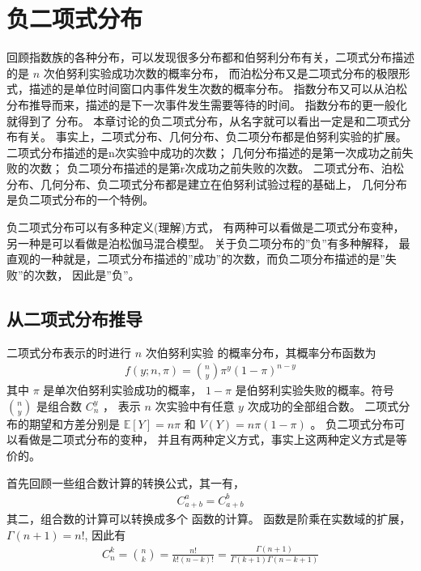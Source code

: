 \documentclass[letterpaper,10pt,english]{sphinxmanual}
\begin{document}
\section{负二项式分布}
\label{\detokenize{_u8d1f_u4e8c_u9879_u6a21_u578b/content:id2}}
回顾指数族的各种分布，可以发现很多分布都和伯努利分布有关，二项式分布描述的是 \(n\) 次伯努利实验成功次数的概率分布，
而泊松分布又是二项式分布的极限形式，描述的是单位时间窗口内事件发生次数的概率分布。
指数分布又可以从泊松分布推导而来，描述的是下一次事件发生需要等待的时间。
指数分布的更一般化就得到了  分布。
本章讨论的负二项式分布，从名字就可以看出一定是和二项式分布有关。
事实上，二项式分布、几何分布、负二项分布都是伯努利实验的扩展。
二项式分布描述的是n次实验中成功的次数；
几何分布描述的是第一次成功之前失败的次数；
负二项分布描述的是第r次成功之前失败的次数。
二项式分布、泊松分布、几何分布、负二项式分布都是建立在伯努利试验过程的基础上，
几何分布是负二项式分布的一个特例。

负二项式分布可以有多种定义(理解)方式，
有两种可以看做是二项式分布变种，另一种是可以看做是泊松\sphinxhyphen{}伽马混合模型。
关于负二项分布的”负”有多种解释，
最直观的一种就是，二项式分布描述的”成功”的次数，而负二项分布描述的是”失败”的次数，
因此是”负”。


\subsection{从二项式分布推导}
\label{\detokenize{_u8d1f_u4e8c_u9879_u6a21_u578b/content:id3}}
二项式分布表示的时进行 \(n\) 次伯努利实验  的概率分布，其概率分布函数为
\begin{equation}\label{equation:负二项模型/content:eq_nb_010}
\begin{split}f(y;n,\pi) =\binom{n}{y} \pi^y(1-\pi)^{n-y}\end{split}
\end{equation}
其中 \(\pi\) 是单次伯努利实验成功的概率，
\(1-\pi\) 是伯努利实验失败的概率。符号 \(\binom{n}{y}\) 是组合数 \(C_{n}^y\) ，
表示 \(n\) 次实验中有任意 \(y\) 次成功的全部组合数。
二项式分布的期望和方差分别是
\(\mathbb{E}[Y]=n\pi\) 和 \(V(Y) = n \pi(1-\pi)\) 。
负二项式分布可以看做是二项式分布的变种，
并且有两种定义方式，事实上这两种定义方式是等价的。

首先回顾一些组合数计算的转换公式，其一有，
\begin{equation}\label{equation:负二项模型/content:eq_nb_011}
\begin{split}C_{a+b}^a=C_{a+b}^b\end{split}
\end{equation}
其二，组合数的计算可以转换成多个  函数的计算。
 函数是阶乘在实数域的扩展，\(\Gamma(n+1)=n!\),
因此有
\begin{equation}\label{equation:负二项模型/content:eq_nb_013}
\begin{split}C_n^k = \binom{n}{k} = \frac{n!}{k!(n-k)!}
= \frac{\Gamma(n+1)  }{\Gamma(k+1)\Gamma(n-k+1)}\end{split}
\end{equation}
\end{document}
